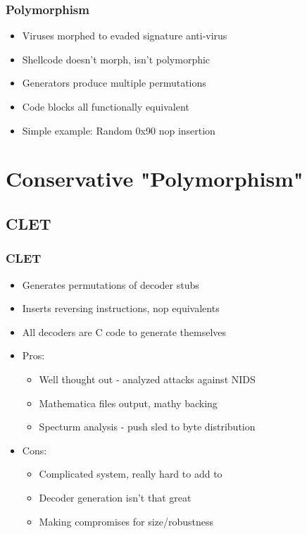 \documentclass{beamer}
\newenvironment{sitemize}{\vspace{1mm}\begin{itemize}\itemsep 4pt\small}{\end{itemize}}
\begin{document}
\begin{frame}[t]
  \frametitle{Polymorphism}
  \begin{sitemize}
    \item Viruses morphed to evaded signature anti-virus
    \item Shellcode doesn't morph, isn't polymorphic
    \item Generators produce multiple permutations
    \item Code blocks all functionally equivalent
    \item Simple example: Random 0x90 nop insertion
  \end{sitemize}
\end{frame}

\section{Conservative "Polymorphism"}

\subsection{CLET}

\begin{frame}[t]
  \frametitle{CLET}
  \begin{sitemize}
    \item Generates permutations of decoder stubs
    \item Inserts reversing instructions, nop equivalents
    \item All decoders are C code to generate themselves
    \pause
    \item Pros:
    \begin{sitemize}
      \item Well thought out - analyzed attacks against NIDS
      \item Mathematica files output, mathy backing
      \item Specturm analysis - push sled to byte distribution
    \end{sitemize}
    \pause
    \item Cons:
    \begin{sitemize}
      \item Complicated system, really hard to add to
      \item Decoder generation isn't that great
      \item Making compromises for size/robustness
    \end{sitemize}
  \end{sitemize}
\end{frame}
\end{document}
